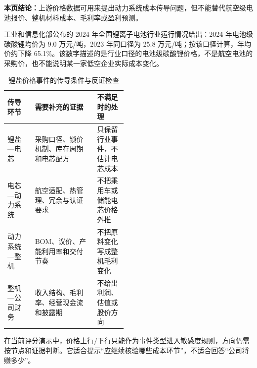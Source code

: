 \textbf{本页结论：}上游价格数据可用来提出动力系统成本传导问题，但不能替代航空级电池报价、整机材料成本、毛利率或盈利预测。

工业和信息化部公布的 2024 年全国锂离子电池行业运行情况给出：2024 年电池级碳酸锂均价为 9.0 万元/吨，2023 年同口径为 25.8 万元/吨；按该口径计算，年均价约下降 65.1\%\cite{wty-miit-lithium}。该数字描述的是行业口径的电池级碳酸锂价格，不是航空电池的采购价，也不能说明某一家低空企业实际成本变化。

\begin{table}[htbp]
\centering
\caption{锂盐价格事件的传导条件与反证检查}
\label{tab:wty-price-case}
\small
\begin{tabularx}{\linewidth}{p{0.23\linewidth}X p{0.25\linewidth}}
\toprule
传导环节 & 需要补充的证据 & 不满足时的处理 \\
\midrule
锂盐—电芯 & 采购口径、锁价机制、库存周期和电芯配方 & 只保留行业事件，不估计电芯成本 \\
电芯—动力系统 & 航空适配、热管理、冗余与认证要求 & 不把乘用车或储能电芯价格外推 \\
动力系统—整机 & BOM、议价、产能利用率和交付节奏 & 不把原料变化写成整机毛利变化 \\
整机—公司财务 & 收入结构、毛利率、经营现金流和披露期 & 不给出利润、估值或股价方向 \\
\bottomrule
\end{tabularx}
\end{table}

在当前评分演示中，价格上行/下行只能作为事件类型进入敏感度规则，方向仍需按节点和证据判断。它适合提示“应继续核验哪些成本环节”，不适合回答“公司将赚多少”。

